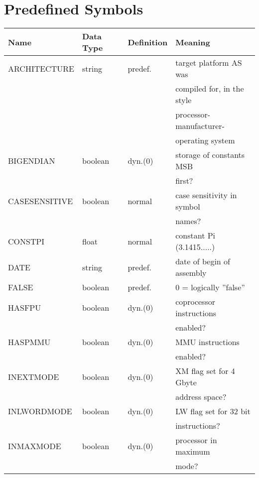 \documentclass[12pt,twoside]{report}
\begin{document}
\cleardoublepage
\chapter{Predefined Symbols}
\label{AppInternSyms}

\begin{center}\begin{longtable}{|l|l|l|l|}
\hline
Name          & Data Type & Definition & Meaning \\
\hline
\hline
\endhead
ARCHITECTURE  & string    & predef.    & target platform AS was \\
              &           &            & compiled for, in the style \\
              &           &            & processor-manufacturer- \\
              &           &            & operating system \\
BIGENDIAN     & boolean   & dyn.(0)    & storage of constants MSB \\
              &           &            & first? \\
CASESENSITIVE & boolean   & normal     & case sensitivity in symbol \\
              &           &            & names? \\
CONSTPI       & float     & normal     & constant Pi (3.1415.....) \\
DATE          & string    & predef.    & date of begin of assembly \\
FALSE         & boolean   & predef.    & 0 = logically ''false'' \\
HASFPU        & boolean   & dyn.(0)    & coprocessor instructions \\
              &           &            & enabled? \\
HASPMMU       & boolean   & dyn.(0)    & MMU instructions \\
              &           &            & enabled? \\
INEXTMODE     & boolean   & dyn.(0)    & XM flag set for 4 Gbyte \\
              &           &            & address space? \\
INLWORDMODE   & boolean   & dyn.(0)    & LW flag set for 32 bit \\
              &           &            & instructions? \\
INMAXMODE     & boolean   & dyn.(0)    & processor in maximum \\
              &           &            & mode? \\

\end{longtable}
\end{center}
\end{document}
